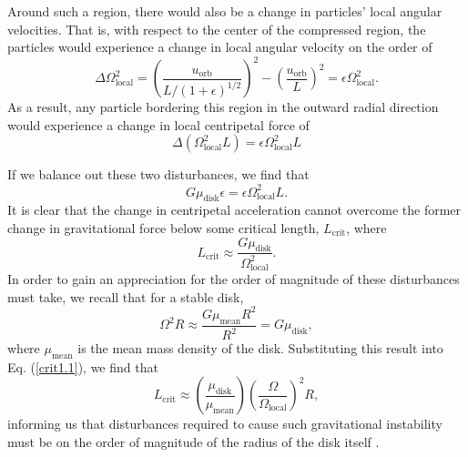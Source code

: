 \documentclass[aps,pra,twocolumn]{revtex4-1}
\begin{document}
Around such a region, there would also be a change in particles' local angular velocities.  That is, with respect to the center of the compressed region, the particles would experience a change in local angular velocity on the order of 
\begin{equation}
\Delta \Omega_\text{local}^2 = \left(\frac{u_\text{orb}}{L/(1+\epsilon)^{1/2}}\right)^2 - \left(\frac{u_\text{orb}}{L}\right)^2 =  \epsilon\Omega_\text{local}^2.
\end{equation}
As a result, any particle bordering this region in the outward radial direction would experience a change in local centripetal force of \cite{toomre1964}
\begin{equation}
\Delta (\Omega_\text{local}^2 L) = \epsilon \Omega_\text{local}^2 L
\end{equation}

If we balance out these two disturbances, we find that 
\begin{equation}
G \mu_\text{disk} \epsilon = \epsilon \Omega_\text{local}^2 L.
\end{equation}
It is clear that the change in centripetal acceleration cannot overcome the former change in gravitational force below some critical length, $L_\text{crit}$, where
\begin{equation}
L_\text{crit} \approx \frac{G \mu_\text{disk}}{\Omega_\text{local}^2}. \label{crit1.1}
\end{equation}
In order to gain an appreciation for the order of magnitude of these disturbances must take, we recall that for a stable disk,
\begin{equation}
\Omega^2 R \approx \frac{G\mu_\text{mean} R^2}{R^2} = G\mu_\text{disk},
\end{equation}
where $\mu_\text{mean}$ is the mean mass density of the disk.  Substituting this result into Eq. (\ref{crit1.1}), we find that
\begin{equation}
L_\text{crit} \approx \left(\frac{\mu_\text{disk}}{\mu_\text{mean}}\right)\left(\frac{\Omega}{\Omega_\text{local}}\right)^2 R,
\end{equation}
informing us that disturbances required to cause such gravitational instability must be on the order of magnitude of the radius of the disk itself \cite{toomre1964}.
\end{document}
